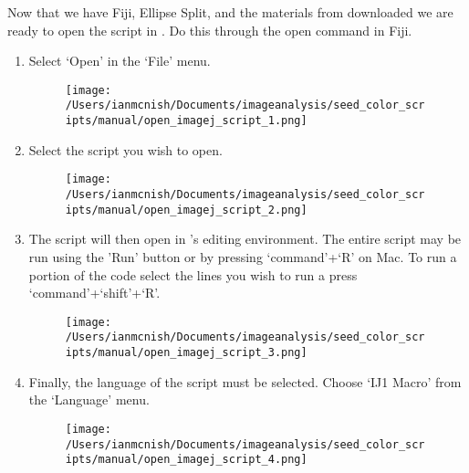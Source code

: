 \documentclass[12pt]{article}
\begin{document}
\noindent Now that we have Fiji, Ellipse Split, and the materials from  downloaded we are ready to open the script in . Do this through the open command in Fiji.\\

\begin{enumerate}

\item Select `Open' in the `File' menu.\\

\begin{figure}[H]
	\centering
	\texttt{[image: /Users/ianmcnish/Documents/imageanalysis/seed\_color\_scripts/manual/open\_imagej\_script\_1.png]}
	\label{fig:open_imagej_script_1}
\end{figure}

\item Select the script you wish to open.\\

\begin{figure}[H]
	\centering
	\texttt{[image: /Users/ianmcnish/Documents/imageanalysis/seed\_color\_scripts/manual/open\_imagej\_script\_2.png]}
	\label{fig:open_imagej_script_2}
\end{figure}

\item The script will then open in 's editing environment. The entire script may be run using the 'Run' button or by pressing `command'+`R' on Mac. To run a portion of the code select the lines you wish to run a press `command'+`shift'+`R'.\\

\begin{figure}[H]
	\centering
	\texttt{[image: /Users/ianmcnish/Documents/imageanalysis/seed\_color\_scripts/manual/open\_imagej\_script\_3.png]}
	\label{fig:open_imagej_script_3}
\end{figure}

\item Finally, the language of the script must be selected. Choose `IJ1 Macro' from the `Language' menu.\\

\begin{figure}[H]
	\centering
	\texttt{[image: /Users/ianmcnish/Documents/imageanalysis/seed\_color\_scripts/manual/open\_imagej\_script\_4.png]}
	\label{fig:open_imagej_script_3}
\end{figure}

\end{enumerate}
\end{document}
